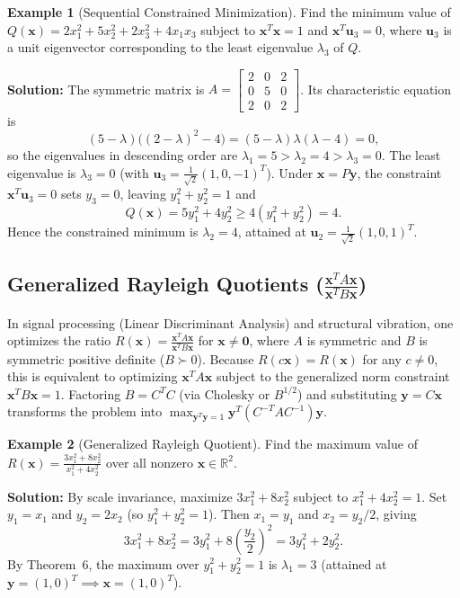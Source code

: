 \documentclass[11pt, letterpaper]{article}
\theoremstyle{definition}
\newtheorem{example}{Example}[section]
\theoremstyle{remark}
\newcommand{\R}{\mathbb{R}}
\begin{document}
\begin{example}[Sequential Constrained Minimization]
Find the minimum value of $Q(\mathbf{x}) = 2x_1^2 + 5x_2^2 + 2x_3^2 + 4x_1x_3$ subject to $\mathbf{x}^T \mathbf{x} = 1$ and $\mathbf{x}^T \mathbf{u}_3 = 0$, where $\mathbf{u}_3$ is a unit eigenvector corresponding to the least eigenvalue $\lambda_3$ of $Q$.

\textbf{Solution:} The symmetric matrix is $A = \begin{bmatrix} 2 & 0 & 2 \\ 0 & 5 & 0 \\ 2 & 0 & 2 \end{bmatrix}$. Its characteristic equation is
\[
(5 - \lambda)\bigl((2-\lambda)^2 - 4\bigr) = (5 - \lambda)\lambda(\lambda - 4) = 0,
\]
so the eigenvalues in descending order are $\lambda_1 = 5 > \lambda_2 = 4 > \lambda_3 = 0$. The least eigenvalue is $\lambda_3 = 0$ (with $\mathbf{u}_3 = \frac{1}{\sqrt{2}}(1, 0, -1)^T$). Under $\mathbf{x} = P\mathbf{y}$, the constraint $\mathbf{x}^T \mathbf{u}_3 = 0$ sets $y_3 = 0$, leaving $y_1^2 + y_2^2 = 1$ and
\[
Q(\mathbf{x}) = 5y_1^2 + 4y_2^2 \ge 4(y_1^2 + y_2^2) = 4.
\]
Hence the constrained minimum is $\lambda_2 = 4$, attained at $\mathbf{u}_2 = \frac{1}{\sqrt{2}}(1, 0, 1)^T$.
\end{example}

\subsection{Generalized Rayleigh Quotients ($\frac{\mathbf{x}^T A \mathbf{x}}{\mathbf{x}^T B \mathbf{x}}$)}
In signal processing (Linear Discriminant Analysis) and structural vibration, one optimizes the ratio $R(\mathbf{x}) = \frac{\mathbf{x}^T A \mathbf{x}}{\mathbf{x}^T B \mathbf{x}}$ for $\mathbf{x} \neq \mathbf{0}$, where $A$ is symmetric and $B$ is symmetric positive definite ($B \succ 0$). Because $R(c\mathbf{x}) = R(\mathbf{x})$ for any $c \neq 0$, this is equivalent to optimizing $\mathbf{x}^T A \mathbf{x}$ subject to the generalized norm constraint $\mathbf{x}^T B \mathbf{x} = 1$. Factoring $B = C^T C$ (via Cholesky or $B^{1/2}$) and substituting $\mathbf{y} = C\mathbf{x}$ transforms the problem into $\max_{\mathbf{y}^T\mathbf{y}=1} \mathbf{y}^T (C^{-T} A C^{-1})\mathbf{y}$.

\begin{example}[Generalized Rayleigh Quotient]
Find the maximum value of $R(\mathbf{x}) = \frac{3x_1^2 + 8x_2^2}{x_1^2 + 4x_2^2}$ over all nonzero $\mathbf{x} \in \R^2$.

\textbf{Solution:} By scale invariance, maximize $3x_1^2 + 8x_2^2$ subject to $x_1^2 + 4x_2^2 = 1$. Set $y_1 = x_1$ and $y_2 = 2x_2$ (so $y_1^2 + y_2^2 = 1$). Then $x_1 = y_1$ and $x_2 = y_2/2$, giving
\[
3x_1^2 + 8x_2^2 = 3y_1^2 + 8\left(\frac{y_2}{2}\right)^2 = 3y_1^2 + 2y_2^2.
\]
By Theorem~6, the maximum over $y_1^2 + y_2^2 = 1$ is $\lambda_1 = 3$ (attained at $\mathbf{y} = (1, 0)^T \implies \mathbf{x} = (1, 0)^T$).
\end{example}
\end{document}
